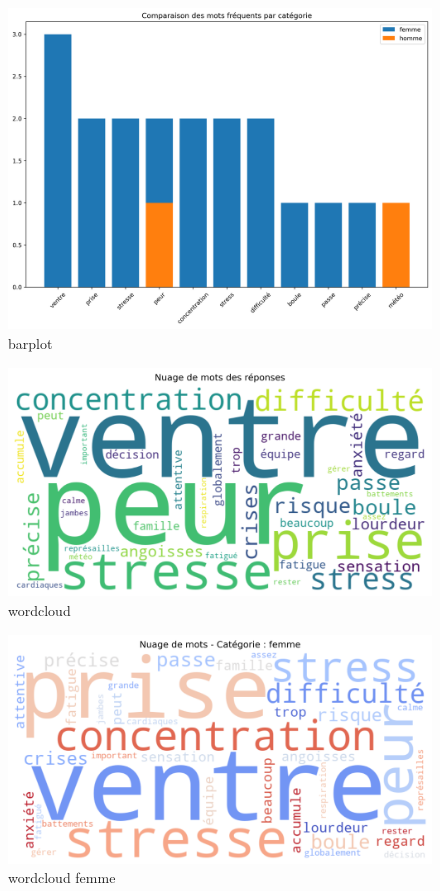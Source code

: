 \documentclass[
]{article}
\begin{document}
\begin{figure}
\centering
\includegraphics{Image/barplot_mots_sexe.png}
\caption{barplot}
\end{figure}

\begin{figure}
\centering
\includegraphics{Image/all_wordcloud.png}
\caption{wordcloud}
\end{figure}

\begin{figure}
\centering
\includegraphics{Image/wordcloud_femme.png}
\caption{wordcloud femme}
\end{figure}
\end{document}
